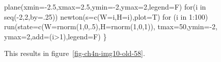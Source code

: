 \documentclass[
  a4paper,
  DIV=11,
  numbers=noendperiod,
  oneside]{scrreprt}
\newenvironment{Shaded}{}{}
\newcommand{\AttributeTok}[1]{\textcolor[rgb]{0.84,0.23,0.29}{#1}}
\newcommand{\ControlFlowTok}[1]{\textcolor[rgb]{0.84,0.23,0.29}{#1}}
\newcommand{\DecValTok}[1]{\textcolor[rgb]{0.00,0.36,0.77}{#1}}
\newcommand{\FloatTok}[1]{\textcolor[rgb]{0.00,0.36,0.77}{#1}}
\newcommand{\FunctionTok}[1]{\textcolor[rgb]{0.44,0.26,0.76}{#1}}
\newcommand{\NormalTok}[1]{\textcolor[rgb]{0.14,0.16,0.18}{#1}}
\newcommand{\SpecialCharTok}[1]{\textcolor[rgb]{0.00,0.36,0.77}{#1}}
\begin{document}
\begin{Shaded}
\begin{Highlighting}[]
\FunctionTok{plane}\NormalTok{(}\AttributeTok{xmin=}\SpecialCharTok{{-}}\FloatTok{2.5}\NormalTok{,}\AttributeTok{xmax=}\FloatTok{2.5}\NormalTok{,}\AttributeTok{ymin=}\SpecialCharTok{{-}}\DecValTok{2}\NormalTok{,}\AttributeTok{ymax=}\DecValTok{2}\NormalTok{,}\AttributeTok{legend=}\NormalTok{F)}
\ControlFlowTok{for}\NormalTok{(i }\ControlFlowTok{in} \FunctionTok{seq}\NormalTok{(}\SpecialCharTok{{-}}\DecValTok{2}\NormalTok{,}\DecValTok{2}\NormalTok{,}\AttributeTok{by=}\NormalTok{.}\DecValTok{25}\NormalTok{)) }\FunctionTok{newton}\NormalTok{(}\AttributeTok{s=}\FunctionTok{c}\NormalTok{(}\AttributeTok{W=}\NormalTok{i,}\AttributeTok{H=}\NormalTok{i),}\AttributeTok{plot=}\NormalTok{T)}
\ControlFlowTok{for}\NormalTok{ (i }\ControlFlowTok{in} \DecValTok{1}\SpecialCharTok{:}\DecValTok{100}\NormalTok{)}
  \FunctionTok{run}\NormalTok{(}\AttributeTok{state=}\FunctionTok{c}\NormalTok{(}\AttributeTok{W=}\FunctionTok{rnorm}\NormalTok{(}\DecValTok{1}\NormalTok{,}\DecValTok{0}\NormalTok{,.}\DecValTok{5}\NormalTok{),}\AttributeTok{H=}\FunctionTok{rnorm}\NormalTok{(}\DecValTok{1}\NormalTok{,}\DecValTok{0}\NormalTok{,}\DecValTok{1}\NormalTok{)), }\AttributeTok{tmax=}\DecValTok{50}\NormalTok{,}\AttributeTok{ymin=}\SpecialCharTok{{-}}\DecValTok{2}\NormalTok{,}
      \AttributeTok{ymax=}\DecValTok{2}\NormalTok{,}\AttributeTok{add=}\NormalTok{(i}\SpecialCharTok{\textgreater{}}\DecValTok{1}\NormalTok{),}\AttributeTok{legend=}\NormalTok{F)}
\NormalTok{\}}
\end{Highlighting}
\end{Shaded}

This results in figure~\ref{fig-ch4n-img10-old-58}.
\end{document}
